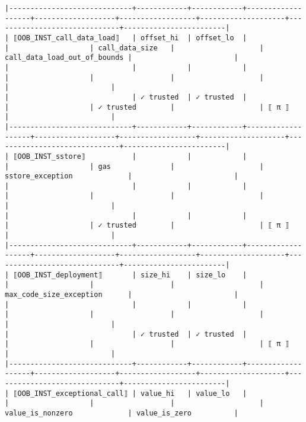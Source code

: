 \documentclass[varwidth=\maxdimen,margin=0.5cm,multi={verbatim}]{standalone}
\begin{document}
\begin{verbatim}
|-----------------------------+------------+------------+-------------------+-------------------+------------------+--------------------+------------------------------+------------------------|
| ⟦OOB_INST_call_data_load⟧   | offset_hi  | offset_lo  |                   |                   | call_data_size   |                    | call_data_load_out_of_bounds |                        |
|                             |            |            |                   |                   |                  |                    |                              |                        |
|                             | ✓ trusted  | ✓ trusted  |                   |                   | ✓ trusted        |                    | ⟦ π ⟧                        |                        |
|-----------------------------+------------+------------+-------------------+-------------------+------------------+--------------------+------------------------------+------------------------|
| ⟦OOB_INST_sstore⟧           |            |            |                   |                   | gas              |                    | sstore_exception             |                        |
|                             |            |            |                   |                   |                  |                    |                              |                        |
|                             |            |            |                   |                   | ✓ trusted        |                    | ⟦ π ⟧                        |                        |
|-----------------------------+------------+------------+-------------------+-------------------+------------------+--------------------+------------------------------+------------------------|
| ⟦OOB_INST_deployment⟧       | size_hi    | size_lo    |                   |                   |                  |                    | max_code_size_exception      |                        |
|                             |            |            |                   |                   |                  |                    |                              |                        |
|                             | ✓ trusted  | ✓ trusted  |                   |                   |                  |                    | ⟦ π ⟧                        |                        |
|-----------------------------+------------+------------+-------------------+-------------------+------------------+--------------------+------------------------------+------------------------|
| ⟦OOB_INST_exceptional_call⟧ | value_hi   | value_lo   |                   |                   |                  |                    | value_is_nonzero             | value_is_zero          |

\end{verbatim}
\end{document}
